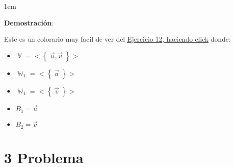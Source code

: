 \documentclass[12pt, fleqn]{article}                             %
\newenvironment{SmallIndentation}[1][0.75em]                    %
        {\begin{adjustwidth}{#1}{}\begin{footnotesize}}             %
        {\end{footnotesize}\end{adjustwidth}}                       %
\theoremstyle{break}                                            %
\DeclareMathOperator \VectorSet    {\mathbb{V}}                 %
\DeclareMathOperator \SubVectorSet {\mathbb{W}}                 %
\newcommand{\Set}[1]    {\left\{ \; #1 \; \right\}}             %
\begin{document}
    \begin{SmallIndentation}[1em]
        \textbf{Demostración}:
        
        Este es un colorario muy facil de ver del \hyperref[sec:10]{\underline{Ejercicio 12, haciendo click}} donde:
        \begin{itemize}
            \item $\VectorSet = <\Set{\vec u, \vec v}>$
            \item $\SubVectorSet_1 = <\Set{\vec u}>$
            \item $\SubVectorSet_1 = <\Set{\vec v}>$
            \item $B_1 = \vec u$
            \item $B_2 = \vec v$
        \end{itemize}
    
    \end{SmallIndentation}
        


\clearpage
\section{3 Problema}
\end{document}
